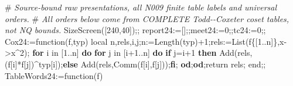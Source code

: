 \documentclass[
  10pt,
  letterpaper,
]{article}
\newenvironment{Shaded}{}{}
\newcommand{\BuiltInTok}[1]{\textcolor[rgb]{0.00,0.50,0.00}{#1}}
\newcommand{\CommentTok}[1]{\textcolor[rgb]{0.38,0.63,0.69}{\textit{#1}}}
\newcommand{\ControlFlowTok}[1]{\textcolor[rgb]{0.00,0.44,0.13}{\textbf{#1}}}
\newcommand{\ExtensionTok}[1]{#1}
\newcommand{\FloatTok}[1]{\textcolor[rgb]{0.25,0.63,0.44}{#1}}
\newcommand{\FunctionTok}[1]{\textcolor[rgb]{0.02,0.16,0.49}{#1}}
\newcommand{\NormalTok}[1]{#1}
\newcommand{\OperatorTok}[1]{\textcolor[rgb]{0.40,0.40,0.40}{#1}}
\newcommand{\VariableTok}[1]{\textcolor[rgb]{0.10,0.09,0.49}{#1}}
\begin{document}
\begin{Shaded}
\begin{Highlighting}[]
\NormalTok{\#}\CommentTok{ Source{-}bound raw presentations, all N009 finite table labels and universal orders.}
\NormalTok{\#}\CommentTok{ All orders below come from COMPLETE Todd{-}{-}Coxeter coset tables, not NQ bounds.}
\BuiltInTok{SizeScreen}\NormalTok{([}\FloatTok{240}\OperatorTok{,}\FloatTok{40}\NormalTok{])}\OperatorTok{;;}
\VariableTok{report24}\OperatorTok{:=}\NormalTok{[]}\OperatorTok{;;}\VariableTok{meet24}\OperatorTok{:=}\FloatTok{0}\OperatorTok{;;}\VariableTok{tc24}\OperatorTok{:=}\FloatTok{0}\OperatorTok{;;}
\VariableTok{Cox24}\OperatorTok{:=}\FunctionTok{function}\NormalTok{(}\VariableTok{f}\OperatorTok{,}\VariableTok{typ}\NormalTok{)}
 \ExtensionTok{local} \VariableTok{n}\OperatorTok{,}\VariableTok{rels}\OperatorTok{,}\VariableTok{i}\OperatorTok{,}\VariableTok{j}\OperatorTok{;}\VariableTok{n}\OperatorTok{:=}\BuiltInTok{Length}\NormalTok{(}\VariableTok{typ}\NormalTok{)}\OperatorTok{+}\FloatTok{1}\OperatorTok{;}\VariableTok{rels}\OperatorTok{:=}\BuiltInTok{List}\NormalTok{(}\VariableTok{f}\NormalTok{\{[}\FloatTok{1}\OperatorTok{..}\VariableTok{n}\NormalTok{]\}}\OperatorTok{,}\VariableTok{x}\OperatorTok{{-}\textgreater{}}\VariableTok{x}\OperatorTok{\^{}}\FloatTok{2}\NormalTok{)}\OperatorTok{;}
 \ControlFlowTok{for} \VariableTok{i} \ExtensionTok{in}\NormalTok{ [}\FloatTok{1}\OperatorTok{..}\VariableTok{n}\NormalTok{] }\ControlFlowTok{do} \ControlFlowTok{for} \VariableTok{j} \ExtensionTok{in}\NormalTok{ [}\VariableTok{i}\OperatorTok{+}\FloatTok{1}\OperatorTok{..}\VariableTok{n}\NormalTok{] }\ControlFlowTok{do}
  \ControlFlowTok{if} \VariableTok{j}\OperatorTok{=}\VariableTok{i}\OperatorTok{+}\FloatTok{1} \ControlFlowTok{then} \BuiltInTok{Add}\NormalTok{(}\VariableTok{rels}\OperatorTok{,}\NormalTok{(}\VariableTok{f}\NormalTok{[}\VariableTok{i}\NormalTok{]}\OperatorTok{*}\VariableTok{f}\NormalTok{[}\VariableTok{j}\NormalTok{])}\OperatorTok{\^{}}\VariableTok{typ}\NormalTok{[}\VariableTok{i}\NormalTok{])}\OperatorTok{;}\ControlFlowTok{else} \BuiltInTok{Add}\NormalTok{(}\VariableTok{rels}\OperatorTok{,}\BuiltInTok{Comm}\NormalTok{(}\VariableTok{f}\NormalTok{[}\VariableTok{i}\NormalTok{]}\OperatorTok{,}\VariableTok{f}\NormalTok{[}\VariableTok{j}\NormalTok{]))}\OperatorTok{;}\ControlFlowTok{fi}\OperatorTok{;}
 \ControlFlowTok{od}\OperatorTok{;}\ControlFlowTok{od}\OperatorTok{;}\ExtensionTok{return} \VariableTok{rels}\OperatorTok{;}
\FunctionTok{end}\OperatorTok{;;}
\VariableTok{TableWords24}\OperatorTok{:=}\FunctionTok{function}\NormalTok{(}\VariableTok{f}\NormalTok{)}

\end{Highlighting}
\end{Shaded}
\end{document}
